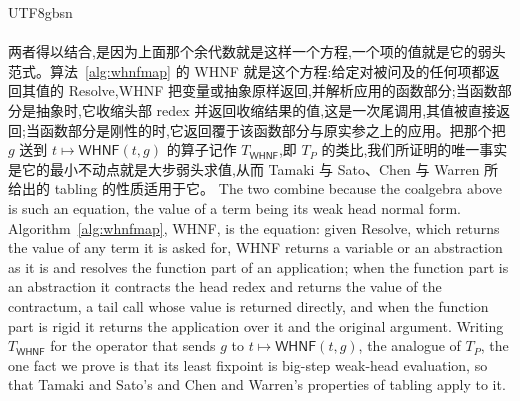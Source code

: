 \begin{CJK*}{UTF8}{gbsn}
  \paragraph{}
  \ifPaperChinese
  两者得以结合,是因为上面那个余代数就是这样一个方程,一个项的值就是它的弱头范式。算法~\ref{alg:whnfmap} 的 \textsf{WHNF} 就是这个方程:给定对被问及的任何项都返回其值的 \textsf{Resolve},\textsf{WHNF} 把变量或抽象原样返回,并解析应用的函数部分;当函数部分是抽象时,它收缩头部 redex 并返回收缩结果的值,这是一次尾调用,其值被直接返回;当函数部分是刚性的时,它返回覆于该函数部分与原实参之上的应用。把那个把 $g$ 送到 $t \mapsto \textsf{WHNF}(t, g)$ 的算子记作 $T_{\textsf{WHNF}}$,即 $T_P$ 的类比,我们所证明的唯一事实是它的最小不动点就是大步弱头求值,从而 Tamaki 与 Sato、Chen 与 Warren 所给出的 tabling 的性质适用于它。
  \else
  The two combine because the coalgebra above is such an equation, the value of a term being its weak head normal form. Algorithm~\ref{alg:whnfmap}, \textsf{WHNF}, is the equation: given \textsf{Resolve}, which returns the value of any term it is asked for, \textsf{WHNF} returns a variable or an abstraction as it is and resolves the function part of an application; when the function part is an abstraction it contracts the head redex and returns the value of the contractum, a tail call whose value is returned directly, and when the function part is rigid it returns the application over it and the original argument. Writing $T_{\textsf{WHNF}}$ for the operator that sends $g$ to $t \mapsto \textsf{WHNF}(t, g)$, the analogue of $T_P$, the one fact we prove is that its least fixpoint is big-step weak-head evaluation, so that Tamaki and Sato's and Chen and Warren's properties of tabling apply to it.
  \fi


\end{CJK*}

